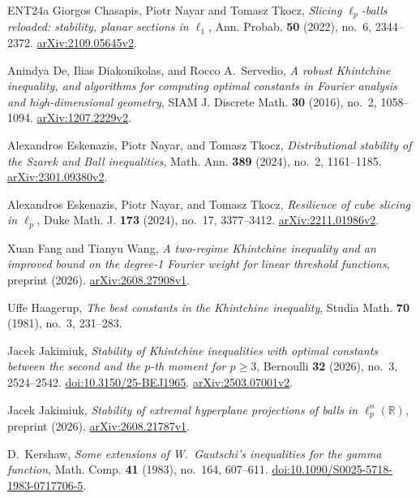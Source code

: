 \documentclass[a4paper,twoside,11pt,reqno]{amsart}
\theoremstyle{definition}
\theoremstyle{remark}
\newcommand{\1}{\mathbbm{1}}
\begin{document}
\begin{thebibliography}{ENT24a}
Giorgos Chasapis, Piotr Nayar and Tomasz Tkocz,
\emph{Slicing $\ell_p$-balls reloaded: stability, planar sections in $\ell_1$},
Ann. Probab. \textbf{50} (2022), no.~6, 2344--2372.
\href{https://arxiv.org/abs/2109.05645v2}{arXiv:2109.05645v2}.

Anindya De, Ilias Diakonikolas, and Rocco A.~Servedio,
\emph{A robust Khintchine inequality, and algorithms for computing optimal constants in Fourier analysis and high-dimensional geometry},
SIAM J. Discrete Math. \textbf{30} (2016), no.~2, 1058--1094.
\href{https://arxiv.org/abs/1207.2229v2}{arXiv:1207.2229v2}.

Alexandros Eskenazis, Piotr Nayar, and Tomasz Tkocz,
\emph{Distributional stability of the Szarek and Ball inequalities},
Math. Ann. \textbf{389} (2024), no.~2, 1161--1185.
\href{https://arxiv.org/abs/2301.09380v2}{arXiv:2301.09380v2}.

Alexandros Eskenazis, Piotr Nayar, and Tomasz Tkocz,
\emph{Resilience of cube slicing in $\ell_p$},
Duke Math. J. \textbf{173} (2024), no.~17, 3377--3412.
\href{https://arxiv.org/abs/2211.01986v2}{arXiv:2211.01986v2}.

Xuan Fang and Tianyu Wang,
\emph{A two-regime Khintchine inequality and an improved bound on the degree-1 Fourier weight for linear threshold functions},
preprint (2026).
\href{https://arxiv.org/abs/2608.27908v1}{arXiv:2608.27908v1}.

Uffe Haagerup,
\emph{The best constants in the Khintchine inequality},
Studia Math. \textbf{70} (1981), no.~3, 231--283.

Jacek Jakimiuk,
\emph{Stability of Khintchine inequalities with optimal constants between the second and the $p$-th moment for $p\ge3$},
Bernoulli \textbf{32} (2026), no.~3, 2524--2542.
\href{https://doi.org/10.3150/25-BEJ1965}{doi:10.3150/25-BEJ1965}.
\href{https://arxiv.org/abs/2503.07001v2}{arXiv:2503.07001v2}.

Jacek Jakimiuk,
\emph{Stability of extremal hyperplane projections of balls in $\ell_p^n(\mathbb R)$},
preprint (2026).
\href{https://arxiv.org/abs/2608.21787v1}{arXiv:\allowbreak2608.21787v1}.

D.~Kershaw,
\emph{Some extensions of W.~Gautschi's inequalities for the gamma function},
Math. Comp. \textbf{41} (1983), no.~164, 607--611.
\href{https://doi.org/10.1090/S0025-5718-1983-0717706-5}{doi:10.1090/S0025-5718-1983-0717706-5}.


\end{thebibliography}
\end{document}
